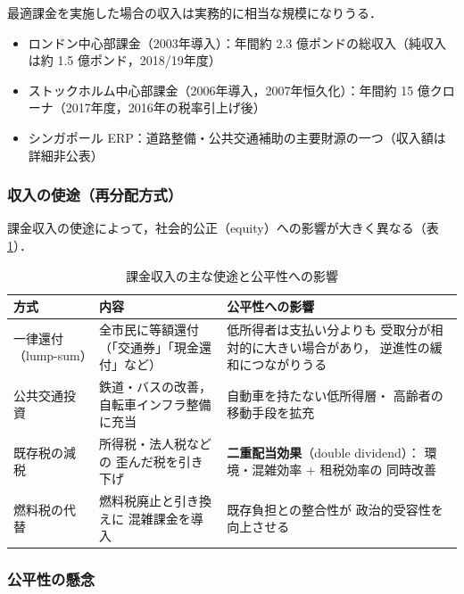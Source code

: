 最適課金を実施した場合の収入は実務的に相当な規模になりうる．

\begin{itemize}
  \item ロンドン中心部課金（2003年導入）：年間約 2.3 億ポンドの総収入（純収入は約 1.5 億ポンド，2018/19年度）
  \item ストックホルム中心部課金（2006年導入，2007年恒久化）：年間約 15 億クローナ（2017年度，2016年の税率引上げ後）
  \item シンガポール ERP：道路整備・公共交通補助の主要財源の一つ（収入額は詳細非公表）
\end{itemize}

\subsubsection*{収入の使途（再分配方式）}

課金収入の使途によって，社会的公正（equity）への影響が大きく異なる（表\ref{tab:revenue-use}）．

\begin{table}[hbtp]
  \centering
  \caption{課金収入の主な使途と公平性への影響}
  \label{tab:revenue-use}
  \begin{tabular}{p{3.5cm}p{5.5cm}p{4.5cm}}
    \toprule
    方式 & 内容 & 公平性への影響 \\
    \midrule
    一律還付（lump-sum） &
      全市民に等額還付
      （「交通券」「現金還付」など） &
      低所得者は支払い分よりも
      受取分が相対的に大きい場合があり，
      逆進性の緩和につながりうる \\[4pt]
    公共交通投資 &
      鉄道・バスの改善，
      自転車インフラ整備に充当 &
      自動車を持たない低所得層・
      高齢者の移動手段を拡充 \\[4pt]
    既存税の減税 &
      所得税・法人税などの
      歪んだ税を引き下げ &
      \textbf{二重配当効果}（double dividend）：
      環境・混雑効率 + 租税効率の
      同時改善 \\[4pt]
    燃料税の代替 &
      燃料税廃止と引き換えに
      混雑課金を導入 &
      既存負担との整合性が
      政治的受容性を向上させる \\
    \bottomrule
  \end{tabular}
\end{table}

\subsubsection*{公平性の懸念}

